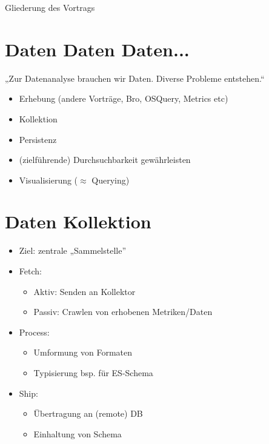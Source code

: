 \documentclass{beamer}
\date{\today}
\def\tocname{Gliederung des Vortrags}
\begin{document}
\fontsize{14pt}{14pt}
	
{
\begin{frame}%
	\titlepage
\end{frame}}

\begin{frame}{\tocname}
	\tableofcontents
\end{frame}

\section{Daten Daten Daten...}

\begin{frame}{\insertsection}
	\fontsize{20pt}{7.2}\selectfont
	„Zur Datenanalyse brauchen wir Daten. Diverse Probleme entstehen.“
\end{frame}

\begin{frame}{\insertsection}
	\begin{itemize}
		\setlength\itemsep{1em}
		\item Erhebung (andere Vorträge, Bro, OSQuery, Metrics etc)
		\item Kollektion
		\item Persistenz
		\item (zielführende) Durchsuchbarkeit gewährleisten
		\item Visualisierung ($\approx$ Querying)
	\end{itemize}
\end{frame}

\section{Daten Kollektion}

\begin{frame}{\insertsection}
	\begin{itemize}
		\setlength\itemsep{0.7em}
		\item Ziel: zentrale „Sammelstelle”
		\item Fetch: 
			\begin{itemize}
				\setlength\itemsep{1em}
				\item Aktiv: Senden an Kollektor
				\item Passiv: Crawlen von erhobenen Metriken/Daten
			\end{itemize}
		\item Process: 
			\begin{itemize}
				\setlength\itemsep{1em}
				\item Umformung von Formaten
				\item Typisierung bsp. für ES-Schema
			\end{itemize}
		\item Ship: 
			\begin{itemize}
				\setlength\itemsep{1em}
				\item Übertragung an (remote) DB
				\item Einhaltung von Schema
			\end{itemize}
	\end{itemize}
\end{frame}
\end{document}
